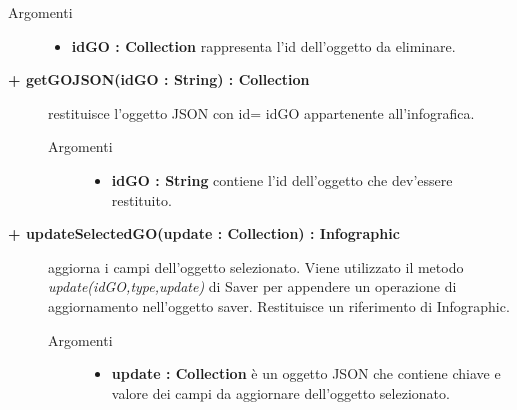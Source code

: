 \begin{description}
\begin{description}
\begin{description}
			\item[Argomenti] \hfill
				\begin{itemize}
						\item \textbf{idGO : Collection			} \hfill
					rappresenta l'id dell'oggetto da eliminare.
				\end{itemize}

\end{description}

\end{description}

\begin{description}
		\item[\textbf{\color{blue}+ getGOJSON(idGO : String) : Collection			}] \hfill
			restituisce l'oggetto JSON con id= idGO appartenente all'infografica.   

\begin{description}
			\item[Argomenti] \hfill
				\begin{itemize}
						\item \textbf{idGO : String			} \hfill
					contiene l'id dell'oggetto che dev'essere restituito.
				\end{itemize}

\end{description}

\end{description}

\begin{description}
		\item[\textbf{\color{blue}+ updateSelectedGO(update : Collection) : Infographic			}] \hfill
			aggiorna i campi dell'oggetto selezionato. Viene utilizzato il metodo \textit{update(idGO,type,update)} di Saver per appendere un operazione di aggiornamento nell'oggetto saver. Restituisce un riferimento di Infographic.  

\begin{description}
			\item[Argomenti] \hfill
				\begin{itemize}
						\item \textbf{update : Collection			} \hfill
					è un oggetto JSON che contiene chiave e valore dei campi da aggiornare dell'oggetto selezionato.
				\end{itemize}


\end{description}
\end{description}
\end{description}
